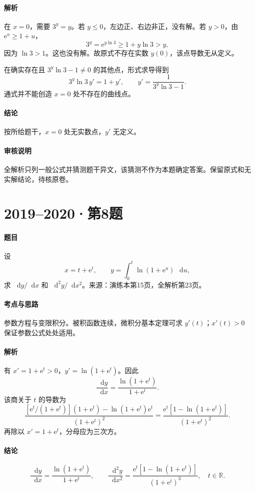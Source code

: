\documentclass[UTF8,fontset=fandol,12pt,oneside,openany]{ctexrep}
\newcommand{\R}{\mathbb R}
\newcommand{\dd}{\mathop{}\!\mathrm d}
\newcommand{\ee}{\mathrm e}
\theoremstyle{definition}
\begin{document}
\paragraph{解析}在 $x=0$，需要 $3^y=y$。若 $y\le0$，左边正、右边非正，没有解。若 $y>0$，由 $\ee^u\ge1+u$，
\[
 3^y=\ee^{y\ln3}\ge1+y\ln3>y,
\]
因为 $\ln3>1$。这也没有解。故原式不存在实数 $y(0)$，该点导数无从定义。

在确实存在且 $3^y\ln3-1\ne0$ 的其他点，形式求导得到
\[
 3^y\ln3\,y'=1+y',\qquad
 y'=\frac1{3^y\ln3-1}.
\]
通式并不能创造 $x=0$ 处不存在的曲线点。
\paragraph{结论}按所给题干，$x=0$ 处无实数点，$y'$ 无定义。
\paragraph{审核说明}全解析只列一般公式并猜测题干异文，该猜测不作为本题确定答案。保留原式和无实解结论，待核原卷。

\par\addvspace{18pt}\noindent\begin{minipage}{\linewidth}
\section{2019--2020·第8题}
\paragraph{题目}设
\[
 x=t+\ee^t,\qquad y=\int_0^t\ln(1+\ee^u)\,\dd u,
\]
求 $\dd y/\dd x$ 和 $\dd^2y/\dd x^2$。来源：演练本第15页，全解析第23页。
\end{minipage}\par
\paragraph{考点与思路}参数方程与变限积分。被积函数连续，微积分基本定理可求 $y'(t)$；$x'(t)>0$ 保证参数公式处处适用。
\paragraph{解析}有 $x'=1+\ee^t>0$，$y'=\ln(1+\ee^t)$。因此
\[
 \frac{\dd y}{\dd x}=\frac{\ln(1+\ee^t)}{1+\ee^t}.
\]
该商关于 $t$ 的导数为
\[
 \frac{[\ee^t/(1+\ee^t)](1+\ee^t)-\ln(1+\ee^t)\ee^t}{(1+\ee^t)^2}
 =\frac{\ee^t[1-\ln(1+\ee^t)]}{(1+\ee^t)^2}.
\]
再除以 $x'=1+\ee^t$，分母应为三次方。
\paragraph{结论}
\[
 \frac{\dd y}{\dd x}=\frac{\ln(1+\ee^t)}{1+\ee^t},\qquad
 \frac{\dd^2y}{\dd x^2}=\frac{\ee^t[1-\ln(1+\ee^t)]}{(1+\ee^t)^3},\quad t\in\R.
\]
\end{document}
